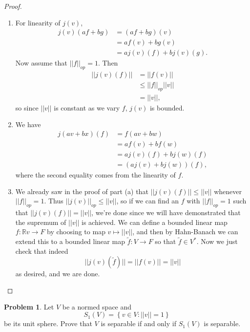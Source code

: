 \documentclass[12pt]{article}
\theoremstyle{definition}
\newtheorem{ex}{Problem}
\begin{document}
\begin{proof}\
	\begin{enumerate}[label=(\alph*)]
		\item For linearity of $j(v)$, \begin{align*}
			      j(v)(af + bg) & = (af + bg)(v)         \\
			                    & = af(v) + bg(v)        \\
			                    & = aj(v)(f) + bj(v)(g).
		      \end{align*}
		      Now assume that $||f||_{op} = 1$.
		      Then \begin{align*}
			      ||j(v)(f)|| & = ||f(v)||           \\
			                  & \leq ||f||_{op}||v|| \\
			                  & = ||v||,
		      \end{align*}
		      so since $||v||$ is constant as we vary $f$, $j(v)$ is bounded.
		\item We have \begin{align*}
			      j(av + bx)(f) & = f(av + bw)          \\
			                    & = af(v) + bf(w)       \\
			                    & = aj(v)(f) + bj(w)(f) \\
			                    & = (aj(v) + bj(w))(f),
		      \end{align*}
		      where the second equality comes from the linearity of $f$.
        \item We already saw in the proof of part (a) that $||j(v)(f)|| \leq ||v||$ whenever $||f||_{op} = 1$.
          Thus $||j(v)||_{op} \leq ||v||$, so if we can find an $f$ with $||f||_{op} = 1$ such that $||j(v)(f)|| = ||v||$, we're done since we will have demonstrated that the supremum of $||v||$ is achieved.
          We can define a bounded linear map $f : \mathbb{R}v \to F$ by choosing to map $v \mapsto ||v||$, and then by Hahn-Banach we can extend this to a bounded linear map $\widetilde{f} : V \to F$ so that $\widetilde{f} \in V^*$.
          Now we just check that indeed \begin{equation*}
            ||j(v)(\widetilde{f})|| = ||f(v)|| = ||v||
          \end{equation*}
          as desired, and we are done.
	\end{enumerate}
\end{proof}

\begin{ex}
	Let $V$ be a normed space and \begin{equation*}
		S_1(V) = \left\lbrace v \in V : ||v|| = 1 \right\rbrace
	\end{equation*}
	be its unit sphere.
	Prove that $V$ is separable if and only if $S_1(V)$ is separable.
\end{ex}
\end{document}
